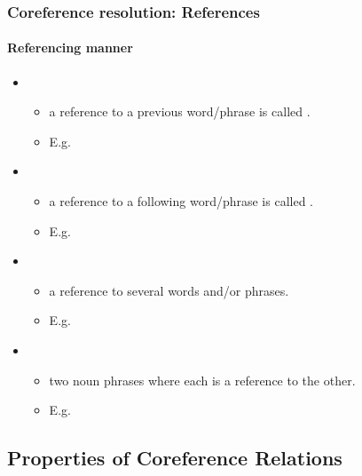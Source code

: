 \documentclass[xcolor=table]{beamer}
\begin{document}
\begin{frame}
	\frametitle{Coreference resolution: References}
	\framesubtitle{Referencing manner}
	
	\begin{itemize}
		\item {}
		\begin{itemize}
			\item a reference to a previous word/phrase is called .
			\item E.g. 
		\end{itemize}
	
		\item {}
		\begin{itemize}
			\item a reference to a following word/phrase is called .
			\item E.g. 
		\end{itemize}
	
		\item {}
		\begin{itemize}
			\item a reference to several words and/or phrases.
			\item E.g. 
		\end{itemize}
	
		\item {}
		\begin{itemize}
			\item two noun phrases where each is a reference to the other.
			\item E.g. 
		\end{itemize}
	\end{itemize}
	
\end{frame}

\subsection{Properties of Coreference Relations}
\end{document}
